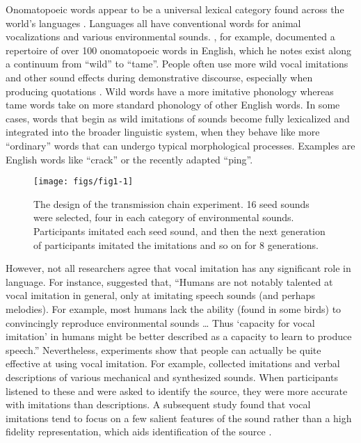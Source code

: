 \documentclass[10pt,letterpaper]{article}
\begin{document}
Onomatopoeic words appear to be a universal lexical category found
across the world's languages \cite{Dingemanse:2012fc}. Languages all
have conventional words for animal vocalizations and various
environmental sounds. , for example, documented a
repertoire of over 100 onomatopoeic words in English, which he notes
exist along a continuum from ``wild'' to ``tame''. People often use more
wild vocal imitations and other sound effects during demonstrative
discourse, especially when producing quotations
\cite{Blackwell:2015ix, Clark:1990cl}. Wild words have a more imitative
phonology whereas tame words take on more standard phonology of other
English words. In some cases, words that begin as wild imitations of
sounds become fully lexicalized and integrated into the broader
linguistic system, when they behave like more ``ordinary'' words that
can undergo typical morphological processes. Examples are English words
like ``crack'' or the recently adapted ``ping''.

\begin{figure}

{\centering \texttt{[image: figs/fig1-1]} 

}

\caption{The design of the transmission chain experiment. 16 seed sounds were selected, four in each category of environmental sounds. Participants imitated each seed sound, and then the next generation of participants imitated the imitations and so on for 8 generations.}\label{fig:fig1}
\end{figure}

However, not all researchers agree that vocal imitation has any
significant role in language. For instance, 
suggested that, ``Humans are not notably talented at vocal imitation in
general, only at imitating speech sounds (and perhaps melodies). For
example, most humans lack the ability (found in some birds) to
convincingly reproduce environmental sounds \ldots{} Thus `capacity for
vocal imitation' in humans might be better described as a capacity to
learn to produce speech.'' Nevertheless, experiments show that people
can actually be quite effective at using vocal imitation. For example,
 collected imitations and verbal descriptions of
various mechanical and synthesized sounds. When participants listened to
these and were asked to identify the source, they were more accurate
with imitations than descriptions. A subsequent study found that vocal
imitations tend to focus on a few salient features of the sound rather
than a high fidelity representation, which aids identification of the
source \cite{Lemaitre:2016kz}.
\end{document}

